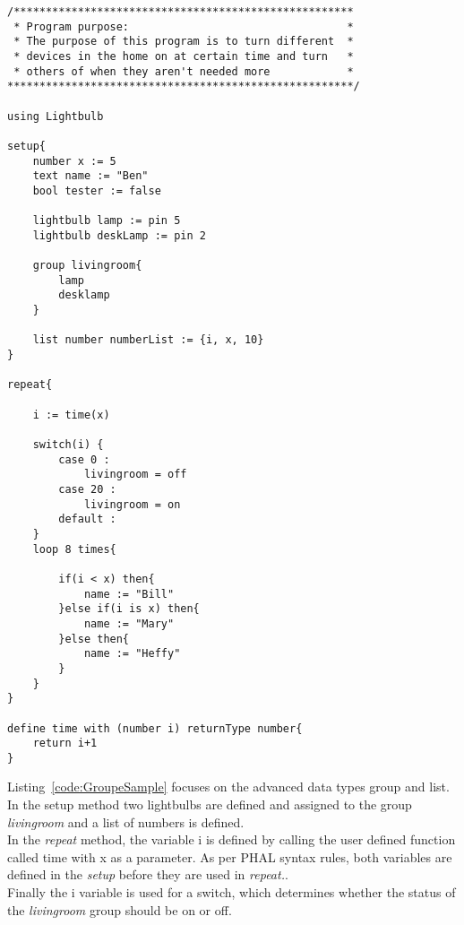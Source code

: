 \begin{lstlisting}[caption={Code sample using groups and loop}, label={code:GroupefSample}]
/*****************************************************
 * Program purpose:                                  *
 * The purpose of this program is to turn different  *
 * devices in the home on at certain time and turn   *
 * others of when they aren't needed more            *
******************************************************/

using Lightbulb

setup{
    number x := 5
    text name := "Ben"
    bool tester := false

    lightbulb lamp := pin 5
    lightbulb deskLamp := pin 2

    group livingroom{
        lamp
        desklamp
    }

    list number numberList := {i, x, 10}
}

repeat{
    
    i := time(x)
    
    switch(i) {
        case 0 :
            livingroom = off
        case 20 :
            livingroom = on
        default :
    }
    loop 8 times{
        
        if(i < x) then{
            name := "Bill"
        }else if(i is x) then{
            name := "Mary"
        }else then{
            name := "Heffy"
        }
    }
}

define time with (number i) returnType number{
    return i+1
}

\end{lstlisting}
Listing~\ref{code:GroupeSample} focuses on the advanced data types group and list. In the setup method two lightbulbs are defined and assigned to the group \textit{livingroom} and a list of numbers is defined.\\
In the \textit{repeat} method, the variable i is defined by calling the user defined function called time with x as a parameter. As per PHAL syntax rules, both variables are defined in the \textit{setup} before they are used in \textit{repeat.}.\\
Finally the i variable is used for a switch, which determines whether the status of the \textit{livingroom} group should be on or off.